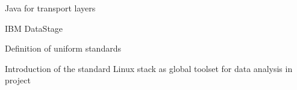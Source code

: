\documentclass[10pt,A4]{article}
\newcommand{\cvlist}[1] {
	\begin{itemize}{#1}\end{itemize}
}
\newcommand{\hide}[1]
{}
\begin{document}
\begin{paracol}{2}
\begin{rightcolumn}
{{				\item{Java for transport layers}%
				\item{IBM DataStage}%
		}}
		{\cvlist{
			\item{Definition of uniform standards}%
			\item{Introduction of the standard Linux stack as global toolset for data analysis in project}%
		}}

	\vfill\null
\end{rightcolumn}
\end{paracol}


\hide{
}
\end{document}
